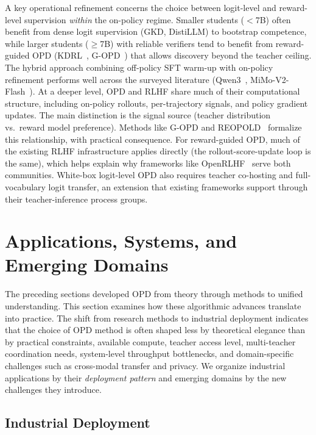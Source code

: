 \documentclass{article} %
\begin{document}
A key operational refinement concerns the choice between logit-level and reward-level supervision \emph{within} the on-policy regime. Smaller students ($<$7B) often benefit from dense logit supervision (GKD, DistiLLM) to bootstrap competence, while larger students ($\ge$7B) with reliable verifiers tend to benefit from reward-guided OPD (KDRL~\citep{2506.02208}, G-OPD~\citep{2602.12125}) that allows discovery beyond the teacher ceiling. The hybrid approach combining off-policy SFT warm-up with on-policy refinement performs well across the surveyed literature (Qwen3~\citep{2505.09388}, MiMo-V2-Flash~\citep{2601.02780}). At a deeper level, OPD and RLHF share much of their computational structure, including on-policy rollouts, per-trajectory signals, and policy gradient updates. The main distinction is the signal source (teacher distribution vs.\ reward model preference). Methods like G-OPD and REOPOLD~\citep{2603.11137} formalize this relationship, with practical consequence. For reward-guided OPD, much of the existing RLHF infrastructure applies directly (the rollout-score-update loop is the same), which helps explain why frameworks like OpenRLHF~\citep{2405.11143} serve both communities. White-box logit-level OPD also requires teacher co-hosting and full-vocabulary logit transfer, an extension that existing frameworks support through their teacher-inference process groups.



\section{Applications, Systems, and Emerging Domains}
\label{sec:applications}

The preceding sections developed OPD from theory through methods to unified understanding. This section examines how these algorithmic advances translate into practice. The shift from research methods to industrial deployment indicates that the choice of OPD method is often shaped less by theoretical elegance than by practical constraints, available compute, teacher access level, multi-teacher coordination needs, system-level throughput bottlenecks, and domain-specific challenges such as cross-modal transfer and privacy. We organize industrial applications by their \emph{deployment pattern} and emerging domains by the new challenges they introduce.

\subsection{Industrial Deployment}
\label{subsec:industrial}
\end{document}
